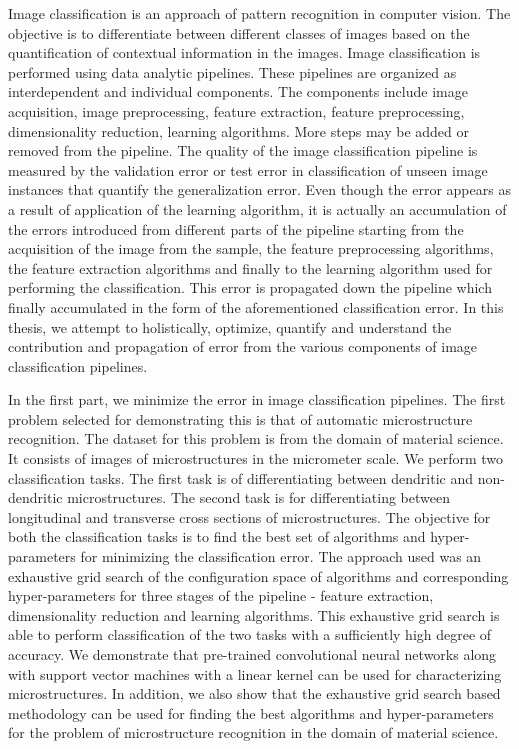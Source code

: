 
Image classification is an approach of pattern recognition in computer vision. The objective is to differentiate between different classes of images based on the quantification of contextual information in the images. Image classification is performed using data analytic pipelines. These pipelines are organized as interdependent and individual components. The components include image acquisition, image preprocessing, feature extraction, feature preprocessing, dimensionality reduction, learning algorithms. More steps may be added or removed from the pipeline. The quality of the image classification pipeline is measured by the validation error or test error in classification of unseen image instances that quantify the generalization error. Even though the error appears as a result of application of the learning algorithm, it is actually an accumulation of the errors introduced from different parts of the pipeline starting from the acquisition of the image from the sample, the feature preprocessing algorithms, the feature extraction algorithms and finally to the learning algorithm used for performing the  classification. This error is propagated down the pipeline which finally accumulated in the form of the aforementioned classification error. In this thesis, we attempt to holistically, optimize, quantify and understand the contribution and propagation of error from the various components of image classification pipelines.   

In the first part, we minimize the error in image classification pipelines. The first problem selected for demonstrating this is that of automatic microstructure recognition. The dataset for this problem is from the domain of material science. It consists of images of microstructures in the micrometer scale. We perform two classification tasks. The first task is of differentiating between dendritic and non-dendritic microstructures. The second task is for differentiating between longitudinal and transverse cross sections of microstructures. The objective for both the classification tasks is to find the best set of algorithms and hyper-parameters for minimizing the classification error. The approach used was an exhaustive grid search of the configuration space of algorithms and corresponding hyper-parameters for three stages of the pipeline - feature extraction, dimensionality reduction and learning algorithms. This exhaustive grid search is able to perform classification of the two tasks with a sufficiently high degree of accuracy. We demonstrate that pre-trained convolutional neural networks along with support vector machines with a linear kernel can be used for characterizing microstructures. In addition, we also show that the exhaustive grid search based methodology can be used for finding the best algorithms and hyper-parameters for the problem of microstructure recognition in the domain of material science.


